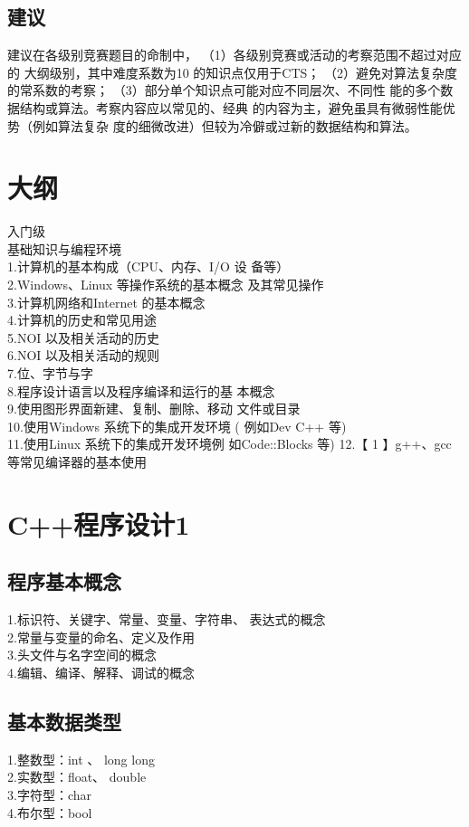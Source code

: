\documentclass[12pt,twiside,a4paper]{ctexbook}
\numberwithin{chapter}{part}
\begin{document}
\subsection{建议}
建议在各级别竞赛题目的命制中，
（1）各级别竞赛或活动的考察范围不超过对应的
大纲级别，其中难度系数为10 的知识点仅用于CTS；
（2）避免对算法复杂度的常系数的考察；
（3）部分单个知识点可能对应不同层次、不同性
能的多个数据结构或算法。考察内容应以常见的、经典
的内容为主，避免虽具有微弱性能优势（例如算法复杂
度的细微改进）但较为冷僻或过新的数据结构和算法。
\section{大纲}
入门级\\
基础知识与编程环境\\
1.计算机的基本构成（CPU、内存、I/O 设
备等）\\
2.Windows、Linux 等操作系统的基本概念
及其常见操作\\
3.计算机网络和Internet 的基本概念\\
4.计算机的历史和常见用途\\
5.NOI 以及相关活动的历史\\
6.NOI 以及相关活动的规则\\
7.位、字节与字\\
8.程序设计语言以及程序编译和运行的基
本概念\\
9.使用图形界面新建、复制、删除、移动
文件或目录\\
10.使用Windows 系统下的集成开发环境
( 例如Dev C++ 等)\\
11.使用Linux 系统下的集成开发环境例
如Code::Blocks 等)
12.【 1 】g++、gcc 等常见编译器的基本使用

\section{C++程序设计1}
\subsection{程序基本概念}
1.标识符、关键字、常量、变量、字符串、
表达式的概念\\
2.常量与变量的命名、定义及作用\\
3.头文件与名字空间的概念\\
4.编辑、编译、解释、调试的概念

\subsection{基本数据类型}
1.整数型：int 、 long long\\
2.实数型：float、 double\\
3.字符型：char\\
4.布尔型：bool
\end{document}

